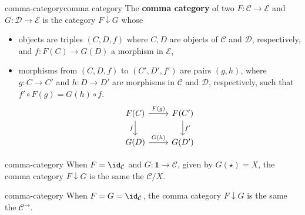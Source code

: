 \begin{topic}{comma-category}{comma category}
    The \textbf{comma category} of two  $F : \mathcal{C} \to \mathcal{E}$ and $G : \mathcal{D} \to \mathcal{E}$ is the category $F \downarrow G$ whose
    \begin{itemize}
        \item objects are triples $(C, D, f)$ where $C, D$ are objects of $\mathcal{C}$ and $\mathcal{D}$, respectively, and $f : F(C) \to G(D)$ a morphism in $\mathcal{E}$,
        \item morphisms from $(C, D, f)$ to $(C', D', f')$ are pairs $(g, h)$, where $g : C \to C'$ and $h : D \to D'$ are morphisms in $\mathcal{C}$ and $\mathcal{D}$, respectively, such that $f' \circ F(g) = G(h) \circ f$.
        \[ \begin{tikzcd}
            F(C) \arrow{r}{F(g)} \arrow[swap]{d}{f} & F(C') \arrow{d}{f'} \\ G(D) \arrow{r}{G(h)} & G(D')
        \end{tikzcd} \]
    \end{itemize}
\end{topic}

\begin{example}{comma-category}
    When $F = \id_\mathcal{C}$ and $G : \textbf{1} \to \mathcal{C}$, given by $G(\star) = X$, the comma category $F \downarrow G$ is the same the  $\mathcal{C}/X$.
\end{example}

\begin{example}{comma-category}
    When $F = G = \id_\mathcal{C}$, the comma category $F \downarrow G$ is the same the  $\mathcal{C}^\rightarrow$.
\end{example}
